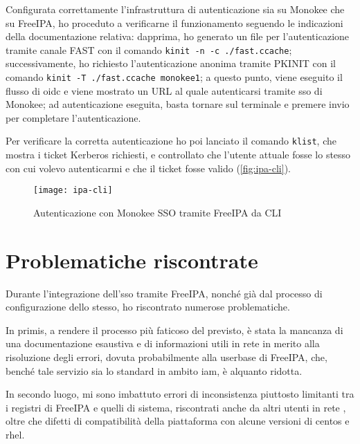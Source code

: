 Configurata correttamente l'infrastruttura di autenticazione sia su Monokee che su FreeIPA, ho proceduto a verificarne il funzionamento seguendo le indicazioni della documentazione relativa: dapprima, ho generato un file per l'autenticazione tramite canale FAST con il comando \texttt{kinit -n -c ./fast.ccache}; successivamente, ho richiesto l'autenticazione anonima tramite PKINIT con il comando \texttt{kinit -T ./fast.ccache monokee1}; a questo punto, viene eseguito il flusso di \acrshort{oidc} e viene mostrato un URL al quale autenticarsi tramite \acrshort{sso} di Monokee; ad autenticazione eseguita, basta tornare sul terminale e premere invio per completare l'autenticazione.

Per verificare la corretta autenticazione ho poi lanciato il comando \texttt{klist}, che mostra i ticket Kerberos richiesti, e controllato che l'utente attuale fosse lo stesso con cui volevo autenticarmi e che il ticket fosse valido (\autoref{fig:ipa-cli}).  

\begin{figure}[!h] 
    \centering 
    \texttt{[image: ipa-cli]} 
    \caption{Autenticazione con Monokee SSO tramite FreeIPA da CLI}
    \label{fig:ipa-cli}
\end{figure}


\section{Problematiche riscontrate}

Durante l'integrazione dell'\acrshort{sso} tramite FreeIPA, nonché già dal processo di configurazione dello stesso, ho riscontrato numerose problematiche.

In primis, a rendere il processo più faticoso del previsto, è stata la mancanza di una  documentazione esaustiva e di informazioni utili in rete in merito alla risoluzione degli errori, dovuta probabilmente alla userbase di FreeIPA, che, benché tale servizio sia lo standard in ambito \acrshort{iam}, è alquanto ridotta.

In secondo luogo, mi sono imbattuto errori di inconsistenza piuttosto limitanti tra i registri di FreeIPA e quelli di sistema, riscontrati anche da altri utenti in rete\cite{site:redhat-bugzilla} \cite{site:freeipa-issue} \cite{site:freeipa-users-1} \cite{site:freeipa-users-2} \cite{site:freeipa-users-3} \cite{site:centos-forums}, oltre che difetti di compatibilità della piattaforma con alcune versioni di \acrshort{centos} e \acrshort{rhel}.

